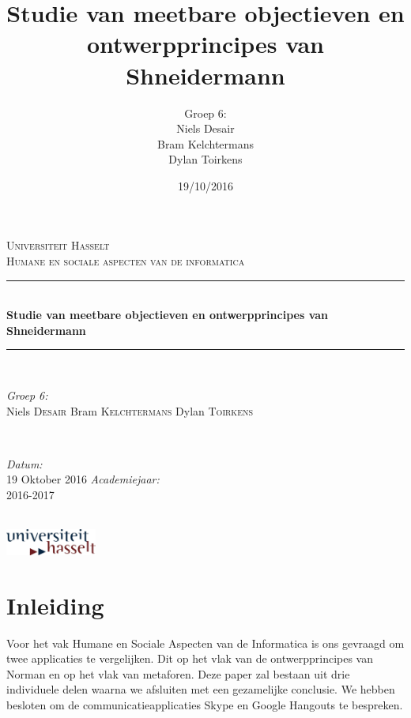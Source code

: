 \documentclass[11pt]{article}
\author{Groep 6:\\
		Niels Desair\\
		Bram Kelchtermans\\
		Dylan Toirkens}
\title{\textbf{Studie van meetbare objectieven en ontwerpprincipes van Shneidermann}}
\date{19/10/2016}
\begin{document}
	\begin{titlepage}
		
		\newcommand{\HRule}{\rule{\linewidth}{0.5mm}} %
		
		\begin{center} %
			
			\textsc{\LARGE Universiteit Hasselt}\\[1.5cm] %
			\textsc{\Large Humane en sociale aspecten van de informatica}\\[0.5cm] %
			
			\HRule \\[0.4cm]
			{ \huge \bfseries Studie van meetbare objectieven en ontwerpprincipes van Shneidermann}\\[0.4cm]
			\HRule \\[1.5cm]
			
			\begin{minipage}{0.4\textwidth}
				\begin{flushleft} \large
					\emph{Groep 6:}\\
					Niels \textsc{Desair} \newline
					Bram \textsc{Kelchtermans} \newline
					Dylan \textsc{Toirkens}
				\end{flushleft}
			\end{minipage}
			~
			\begin{minipage}{0.4\textwidth}
				\begin{flushright} \large
					\emph{Datum:}\\
					19 Oktober 2016
					\emph{Academiejaar: } \\
					2016-2017
				\end{flushright}
			\end{minipage}\\[4cm]
			\vspace{40 mm}
			\includegraphics[width=3.0cm]{uhasselt-logo}\\[2.0cm]  
		\end{center}
	\end{titlepage}

\section{Inleiding}
Voor het vak Humane en Sociale Aspecten van de Informatica is ons gevraagd om twee applicaties te vergelijken. Dit op het vlak van de ontwerpprincipes van Norman en op het vlak van metaforen. Deze paper zal bestaan uit drie individuele delen waarna we afsluiten met een gezamelijke conclusie. We hebben besloten om de communicatieapplicaties Skype en Google Hangouts te bespreken.
\newpage
\end{document}
